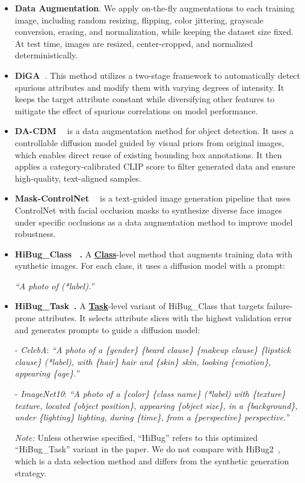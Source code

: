 \documentclass[10pt]{article} %
\newcommand{\hibug}{HiBug\xspace}
\begin{document}
\begin{itemize}
\item \textbf{Data Augmentation}. We apply on-the-fly augmentations to each training image, including random resizing, flipping, color jittering, grayscale conversion, erasing, and normalization, while keeping the dataset size fixed. At test time, images are resized, center-cropped, and normalized deterministically.

\item \textbf{DiGA~\citep{zhang2024distributionally}}. This method utilizes a two-stage framework to automatically detect spurious attributes and modify them with varying degrees of intensity. It keeps the target attribute constant while diversifying other features to mitigate the effect of spurious correlations on model performance.


\item \textbf{DA-CDM ~\citep{fang2024data}} is a data augmentation method for object detection. It uses a controllable diffusion model guided by visual priors from original images, which enables direct reuse of existing bounding box annotations. It then applies a category-calibrated CLIP score to filter generated data and ensure high-quality, text-aligned samples.
\item \textbf{Mask-ControlNet ~\citep{huang2024data}} is a text-guided image generation pipeline that uses ControlNet with facial occlusion masks to synthesize diverse face images under specific occlusions as a data augmentation method to improve model robustness.

    \item \textbf{HiBug\_Class ~\citep{chen2023hibug}.}  
    A \underline{\textbf{Class}}-level method that augments training data with synthetic images. For each class, it uses a diffusion model with a prompt:

    \textit{``A photo of (*label).''}

    \item \textbf{HiBug\_Task~\citep{chen2023hibug}.}  
    A \underline{\textbf{Task}}-level variant of HiBug\_Class that targets failure-prone attributes. It selects attribute slices with the highest validation error and generates prompts to guide a diffusion model:

    - \textit{CelebA}:  
    \textit{``A photo of a \{gender\} \{beard clause\} \{makeup clause\} \{lipstick clause\} (*label), with \{hair\} hair and \{skin\} skin, looking \{emotion\}, appearing \{age\}.''}

    - \textit{ImageNet10}:  
    \textit{``A photo of a \{color\} \{class name\} (*label) with \{texture\} texture, located \{object position\}, appearing \{object size\}, in a \{background\}, under \{lighting\} lighting, during \{time\}, from a \{perspective\} perspective.''}

    \textit{Note:} Unless otherwise specified, ``\hibug'' refers to this optimized ``HiBug\_Task'' variant in the paper. We do not compare with HiBug2~\citep{chen2025hibug2}, which is a data selection method and differs from the synthetic generation strategy.

\end{itemize}
\end{document}
